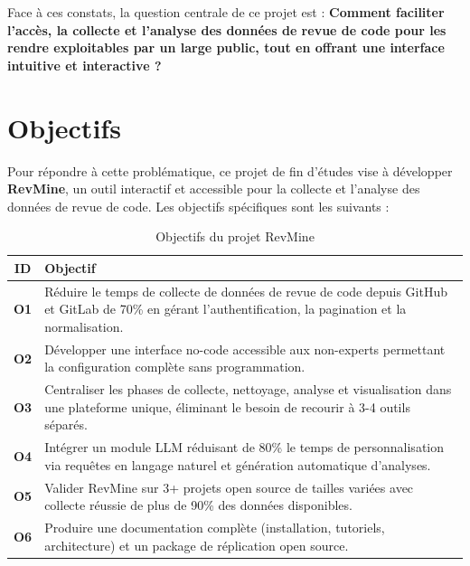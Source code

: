Face à ces constats, la question centrale de ce projet est : \textbf{Comment faciliter l'accès, la collecte et l'analyse des données de revue de code pour les rendre exploitables par un large public, tout en offrant une interface intuitive et interactive ?}

\section{Objectifs}

Pour répondre à cette problématique, ce projet de fin d'études vise à développer \textbf{RevMine}, un outil interactif et accessible pour la collecte et l'analyse des données de revue de code. Les objectifs spécifiques sont les suivants :
\FloatBarrier
\begin{table}[h]
\centering
\caption{Objectifs du projet RevMine}
\label{tab:objectifs_smart}
\begin{tabular}{|c|p{}|}
\hline
\textbf{ID} & \textbf{Objectif} \\
\hline
\textbf{O1} & Réduire le temps de collecte de données de revue de code depuis GitHub et GitLab de 70\% en gérant l’authentification, la pagination et la normalisation. \\
\hline
\textbf{O2} & Développer une interface no-code accessible aux non-experts permettant la configuration complète sans programmation. \\
\hline
\textbf{O3} & Centraliser les phases de collecte, nettoyage, analyse et visualisation dans une plateforme unique, éliminant le besoin de recourir à 3-4 outils séparés. \\
\hline
\textbf{O4} & Intégrer un module LLM réduisant de 80\% le temps de personnalisation via requêtes en langage naturel et génération automatique d'analyses. \\
\hline
\textbf{O5} & Valider RevMine sur 3+ projets open source de tailles variées avec collecte réussie de plus de 90\% des données disponibles. \\
\hline
\textbf{O6} & Produire une documentation complète (installation, tutoriels, architecture) et un package de réplication open source. \\
\hline
\end{tabular}
\end{table}
\FloatBarrier

